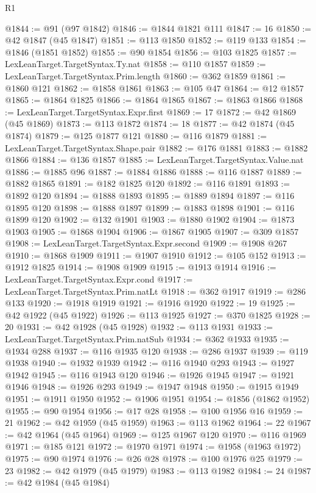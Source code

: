 \begin{lexlean}{R1}
\begin{coremodule}
@1844 := @91 (@97 @1842)
@1846 := @1844 @1821 @111
@1847 := 16
@1850 := @42 @1847 (@45 @1847)
@1851 := @113 @1850
@1852 := @119 @133
@1854 := @1846 (@1851 @1852)
@1855 := @90 @1854
@1856 := @103 @1825
@1857 := LexLeanTarget.TargetSyntax.Ty.nat
@1858 := @110 @1857
@1859 := LexLeanTarget.TargetSyntax.Prim.length
@1860 := @362 @1859
@1861 := @1860 @121
@1862 := @1858 @1861
@1863 := @105 @47
@1864 := @12 @1857
@1865 := @1864 @1825
@1866 := @1864 @1865
@1867 := @1863 @1866
@1868 := LexLeanTarget.TargetSyntax.Expr.first
@1869 := 17
@1872 := @42 @1869 (@45 @1869)
@1873 := @113 @1872
@1874 := 18
@1877 := @42 @1874 (@45 @1874)
@1879 := @125 @1877 @121
@1880 := @116 @1879
@1881 := LexLeanTarget.TargetSyntax.Shape.pair
@1882 := @176 @1881
@1883 := @1882 @1866
@1884 := @136 @1857
@1885 := LexLeanTarget.TargetSyntax.Value.nat
@1886 := @1885 @96
@1887 := @1884 @1886
@1888 := @116 @1887
@1889 := @1882 @1865
@1891 := @182 @1825 @120
@1892 := @116 @1891
@1893 := @1892 @120
@1894 := @1888 @1893
@1895 := @1889 @1894
@1897 := @116 @1895 @120
@1898 := @1888 @1897
@1899 := @1883 @1898
@1901 := @116 @1899 @120
@1902 := @132 @1901
@1903 := @1880 @1902
@1904 := @1873 @1903
@1905 := @1868 @1904
@1906 := @1867 @1905
@1907 := @309 @1857
@1908 := LexLeanTarget.TargetSyntax.Expr.second
@1909 := @1908 @267
@1910 := @1868 @1909
@1911 := @1907 @1910
@1912 := @105 @152
@1913 := @1912 @1825
@1914 := @1908 @1909
@1915 := @1913 @1914
@1916 := LexLeanTarget.TargetSyntax.Expr.cond
@1917 := LexLeanTarget.TargetSyntax.Prim.natLt
@1918 := @362 @1917
@1919 := @286 @133
@1920 := @1918 @1919
@1921 := @1916 @1920
@1922 := 19
@1925 := @42 @1922 (@45 @1922)
@1926 := @113 @1925
@1927 := @370 @1825
@1928 := 20
@1931 := @42 @1928 (@45 @1928)
@1932 := @113 @1931
@1933 := LexLeanTarget.TargetSyntax.Prim.natSub
@1934 := @362 @1933
@1935 := @1934 @288
@1937 := @116 @1935 @120
@1938 := @286 @1937
@1939 := @119 @1938
@1940 := @1932 @1939
@1942 := @116 @1940 @293
@1943 := @1927 @1942
@1945 := @116 @1943 @120
@1946 := @1926 @1945
@1947 := @1921 @1946
@1948 := @1926 @293
@1949 := @1947 @1948
@1950 := @1915 @1949
@1951 := @1911 @1950
@1952 := @1906 @1951
@1954 := @1856 (@1862 @1952)
@1955 := @90 @1954
@1956 := @17 @28
@1958 := @100 @1956 @16
@1959 := 21
@1962 := @42 @1959 (@45 @1959)
@1963 := @113 @1962
@1964 := 22
@1967 := @42 @1964 (@45 @1964)
@1969 := @125 @1967 @120
@1970 := @116 @1969
@1971 := @185 @121
@1972 := @1970 @1971
@1974 := @1958 (@1963 @1972)
@1975 := @90 @1974
@1976 := @26 @28
@1978 := @100 @1976 @25
@1979 := 23
@1982 := @42 @1979 (@45 @1979)
@1983 := @113 @1982
@1984 := 24
@1987 := @42 @1984 (@45 @1984)

\end{coremodule}
\end{lexlean}
